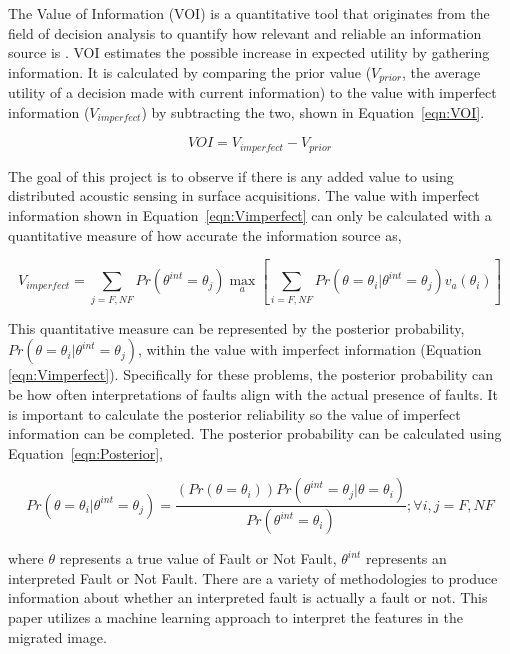 The Value of Information (VOI) is a quantitative tool that originates from the field of decision analysis to quantify how relevant and reliable an information source is \citep{trainor2013value}. VOI estimates the possible increase in expected utility by gathering information. It is calculated by comparing the prior value ($V_{prior}$, the average utility of a decision made with current information) to the value with imperfect information ($V_{imperfect}$) by subtracting the two, shown in  Equation~\ref{eqn:VOI}.

\begin{equation}
  VOI=V_{imperfect}-V_{prior}
\label{eqn:VOI}
\end{equation}

The goal of this project is to observe if there is any added value to using distributed acoustic sensing in surface acquisitions. The value with imperfect information shown in Equation~\ref{eqn:Vimperfect} can only be calculated with a quantitative measure of how accurate the information source as,

\begin{equation}
V_{imperfect} = \sum_{j=F,NF} Pr(\theta^{int}=\theta_j)  {\max_a [\sum_{i=F,NF} Pr(\theta=\theta_i | \theta^{int}=\theta_j)v_a(\theta_i)]}
\label{eqn:Vimperfect}
\end{equation}

This quantitative measure can be represented by the posterior probability, $Pr(\theta=\theta_i | \theta^{int}=\theta_j)$, within the value with imperfect information (Equation \ref{eqn:Vimperfect}). Specifically for these problems, the posterior probability can be how often interpretations of faults align with the actual presence of faults. It is important to calculate the posterior reliability so the value of imperfect information can be completed. The posterior probability can be calculated using Equation~\ref{eqn:Posterior},

\begin{equation}
  Pr(\theta=\theta_i | \theta^{int}=\theta_j)=\frac{(Pr(\theta=\theta_i)) Pr(\theta^{int}=\theta_j | \theta=\theta_i)}{Pr(\theta^{int}=\theta_i)}; \forall i,j={F, NF}
\label{eqn:Posterior}
\end{equation}

\noindent
where $\theta$ represents a true value of Fault or Not Fault, $\theta^{int}$ represents an interpreted Fault or Not Fault. There are a variety of methodologies to produce information about whether an interpreted fault is actually a fault or not. This paper utilizes a machine learning approach to interpret the features in the migrated image.

